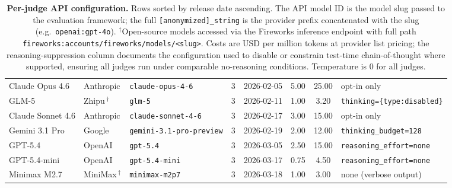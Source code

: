 \begin{table}[!t]
\begin{tabular}{lllclccp{3.5cm}}
Claude Opus 4.6   & Anthropic & \texttt{claude-opus-4-6}                & 3 & 2026-02-05 & 5.00 & 25.00 & opt-in only \\
GLM-5             & Zhipu\,$^{\dagger}$   & \texttt{glm-5}                          & 3 & 2026-02-11 & 1.00 &  3.20 & \texttt{thinking=\{type:disabled\}} \\
Claude Sonnet 4.6 & Anthropic & \texttt{claude-sonnet-4-6}              & 3 & 2026-02-17 & 3.00 & 15.00 & opt-in only \\
Gemini 3.1 Pro    & Google    & \texttt{gemini-3.1-pro-preview}         & 3 & 2026-02-19 & 2.00 & 12.00 & \texttt{thinking\_budget=128} \\
GPT-5.4           & OpenAI    & \texttt{gpt-5.4}                        & 3 & 2026-03-05 & 2.50 & 15.00 & \texttt{reasoning\_effort=none} \\
GPT-5.4-mini      & OpenAI    & \texttt{gpt-5.4-mini}                   & 3 & 2026-03-17 & 0.75 &  4.50 & \texttt{reasoning\_effort=none} \\
Minimax M2.7      & MiniMax\,$^{\dagger}$ & \texttt{minimax-m2p7}                   & 3 & 2026-03-18 & 1.00 &  3.00 & none (verbose output) \\
\bottomrule
\end{tabular}
\caption{\textbf{Per-judge API configuration.} Rows sorted by release
date ascending. The API model ID is the model slug passed to the
evaluation framework; the full \texttt{[anonymized]\_string} is the provider
prefix concatenated with the slug (e.g.\ \texttt{openai:gpt-4o}).
$^{\dagger}$Open-source models accessed via the Fireworks inference
endpoint with full path
\texttt{fireworks:accounts/fireworks/models/<slug>}. Costs are USD
per million tokens at provider list pricing; the reasoning-suppression
column documents the configuration used to disable or constrain
test-time chain-of-thought where supported, ensuring all judges run
under comparable no-reasoning conditions. Temperature is $0$ for all
judges.}
\label{tab:appendix-models}
\end{table}

